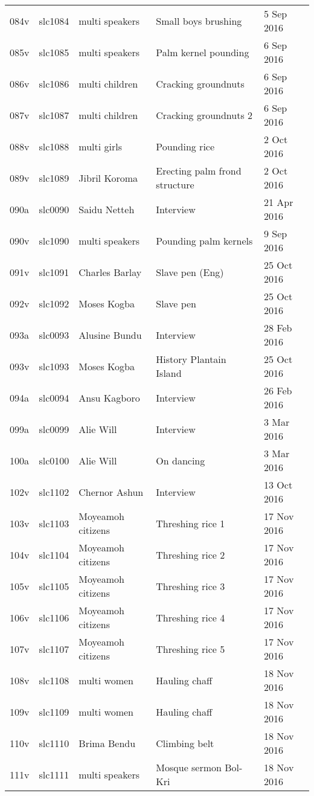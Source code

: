 \begin{xltabular}{\textwidth}{lllQl}
084v & slc1084 & multi speakers & Small boys brushing & 5 Sep 2016\\
085v & slc1085 & multi speakers & Palm kernel pounding & 6 Sep 2016\\
086v & slc1086 & multi children & Cracking groundnuts & 6 Sep 2016\\
087v & slc1087 & multi children & Cracking groundnuts 2 & 6 Sep 2016\\
088v & slc1088 & multi girls & Pounding rice & 2 Oct 2016\\
089v & slc1089 & Jibril Koroma & Erecting palm frond structure & 2 Oct 2016\\
090a & slc0090 & Saidu Netteh & Interview & 21 Apr 2016\\
090v & slc1090 & multi speakers & Pounding palm kernels & 9 Sep 2016\\
091v & slc1091 & Charles Barlay & Slave pen (Eng) & 25 Oct 2016\\
092v & slc1092 & Moses Kogba & Slave pen & 25 Oct 2016\\
093a & slc0093 & Alusine Bundu & Interview & 28 Feb 2016\\
093v & slc1093 & Moses Kogba & History Plantain Island & 25 Oct 2016\\
094a & slc0094 & Ansu Kagboro & Interview & 26 Feb 2016\\
099a & slc0099 & Alie Will & Interview & 3 Mar 2016\\
100a & slc0100 & Alie Will & On dancing & 3 Mar 2016\\
102v & slc1102 & Chernor Ashun & Interview & 13 Oct 2016\\
103v & slc1103 & Moyeamoh citizens & Threshing rice 1 & 17 Nov 2016\\
104v & slc1104 & Moyeamoh citizens & Threshing rice 2 & 17 Nov 2016\\
105v & slc1105 & Moyeamoh citizens & Threshing rice 3 & 17 Nov 2016\\
106v & slc1106 & Moyeamoh citizens & Threshing rice 4 & 17 Nov 2016\\
107v & slc1107 & Moyeamoh citizens & Threshing rice 5 & 17 Nov 2016\\
108v & slc1108 & multi women & Hauling chaff & 18 Nov 2016\\
109v & slc1109 & multi women & Hauling chaff & 18 Nov 2016\\
110v & slc1110 & Brima Bendu & Climbing belt & 18 Nov 2016\\
111v & slc1111 & multi speakers & Mosque sermon Bol-Kri & 18 Nov 2016\\

\end{xltabular}
